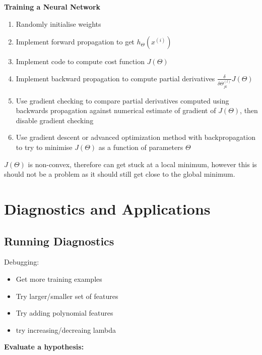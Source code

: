 \documentclass[12pt, a4paper]{article}
\begin{document}
{      \textbf{Training a Neural Network}
      \vspace{-1em}
      \begin{enumerate}
      \item Randomly initialise weights
      \item Implement forward propagation to get $h_\Theta(x^{(i)})$
      \item Implement code to compute cost function $J(\Theta)$
      \item Implement backward propagation to compute partial derivatives 
            $\frac{\delta}{\delta\Theta_{jk}^{(l)}}J(\Theta)$
      \item Use gradient checking to compare partial derivatives computed
            using backwards propagation against numerical estimate of gradient
            of $J(\Theta)$, then disable gradient checking
      \item Use gradient descent or advanced optimization method with 
            backpropagation to try to minimise $J(\Theta)$ as a function of
            parameters $\Theta$
      \end{enumerate}

      $J(\Theta)$ is non-convex, therefore can get stuck at a local minimum, 
      however this is should not be a problem as it should still get close to
      the global minimum.

  \newpage

\section{Diagnostics and Applications}

  \subsection{Running Diagnostics}

    Debugging:
    \vspace{-1em}
    \begin{itemize}
      \item Get more training examples
      \item Try larger/smaller set of features
      \item Try adding polynomial features
      \item try increasing/decreaing lambda
    \end{itemize}

    \textbf{Evaluate a hypothesis:}

}
\end{document}
